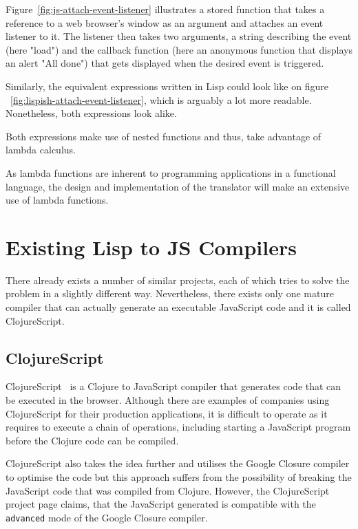 

Figure~\ref{fig:js-attach-event-listener} illustrates a stored function that takes a reference to a web browser's window as an argument and attaches an event listener to it. The listener then takes two arguments, a string describing the event (here "load") and the callback function (here an anonymous function that displays an alert "All done") that gets displayed when the desired event is triggered.



Similarly, the equivalent expressions written in Lisp could look like on figure ~\ref{fig:lispish-attach-event-listener}, which is arguably a lot more readable. Nonetheless, both expressions look alike. 

Both expressions make use of nested functions and thus, take advantage of lambda calculus. 

As lambda functions are inherent to programming applications in a functional language, the design and implementation of the translator will make an extensive use of lambda functions.

\section{Existing Lisp to JS Compilers}\label{existing-implementations}
There already exists a number of similar projects, each of which tries to solve the problem in a slightly different way. Nevertheless, there exists only one mature compiler that can actually generate an executable JavaScript code and it is called ClojureScript.

\subsection{ClojureScript}
ClojureScript~\cite{ClojureScript:2013:Site} is a Clojure to JavaScript compiler that generates code that can be executed in the browser. Although there are examples of companies using ClojureScript for their production applications, it is difficult to operate as it requires to execute a chain of operations, including starting a JavaScript program before the Clojure code can be compiled.

ClojureScript also takes the idea further and utilises the Google Closure compiler to optimise the code but this approach suffers from the possibility of breaking the JavaScript code that was compiled from Clojure. However, the ClojureScript project page claims, that the JavaScript generated is compatible with the \texttt{advanced} mode of the Google Closure compiler.

